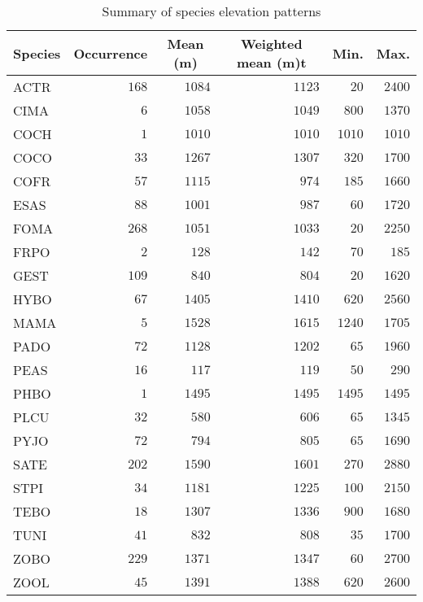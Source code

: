 %
\begin{table}[!tbp]
\caption{Summary of species elevation patterns\label{tbl:era}} 
\begin{center}
\begin{tabular}{|lrrrrr|}
\toprule
\multicolumn{1}{|l}{Species}&\multicolumn{1}{c}{Occurrence}&\multicolumn{1}{c}{Mean (m)}&\multicolumn{1}{c}{Weighted mean (m)t}&\multicolumn{1}{c}{Min.}&\multicolumn{1}{c|}{Max.}\tabularnewline
\midrule
ACTR&$168$&$1084$&$1123$&$  20$&$2400$\tabularnewline
CIMA&$  6$&$1058$&$1049$&$ 800$&$1370$\tabularnewline
COCH&$  1$&$1010$&$1010$&$1010$&$1010$\tabularnewline
COCO&$ 33$&$1267$&$1307$&$ 320$&$1700$\tabularnewline
COFR&$ 57$&$1115$&$ 974$&$ 185$&$1660$\tabularnewline
ESAS&$ 88$&$1001$&$ 987$&$  60$&$1720$\tabularnewline
FOMA&$268$&$1051$&$1033$&$  20$&$2250$\tabularnewline
FRPO&$  2$&$ 128$&$ 142$&$  70$&$ 185$\tabularnewline
GEST&$109$&$ 840$&$ 804$&$  20$&$1620$\tabularnewline
HYBO&$ 67$&$1405$&$1410$&$ 620$&$2560$\tabularnewline
MAMA&$  5$&$1528$&$1615$&$1240$&$1705$\tabularnewline
PADO&$ 72$&$1128$&$1202$&$  65$&$1960$\tabularnewline
PEAS&$ 16$&$ 117$&$ 119$&$  50$&$ 290$\tabularnewline
PHBO&$  1$&$1495$&$1495$&$1495$&$1495$\tabularnewline
PLCU&$ 32$&$ 580$&$ 606$&$  65$&$1345$\tabularnewline
PYJO&$ 72$&$ 794$&$ 805$&$  65$&$1690$\tabularnewline
SATE&$202$&$1590$&$1601$&$ 270$&$2880$\tabularnewline
STPI&$ 34$&$1181$&$1225$&$ 100$&$2150$\tabularnewline
TEBO&$ 18$&$1307$&$1336$&$ 900$&$1680$\tabularnewline
TUNI&$ 41$&$ 832$&$ 808$&$  35$&$1700$\tabularnewline
ZOBO&$229$&$1371$&$1347$&$  60$&$2700$\tabularnewline
ZOOL&$ 45$&$1391$&$1388$&$ 620$&$2600$\tabularnewline
\bottomrule
\end{tabular}
\end{center}
\end{table}

